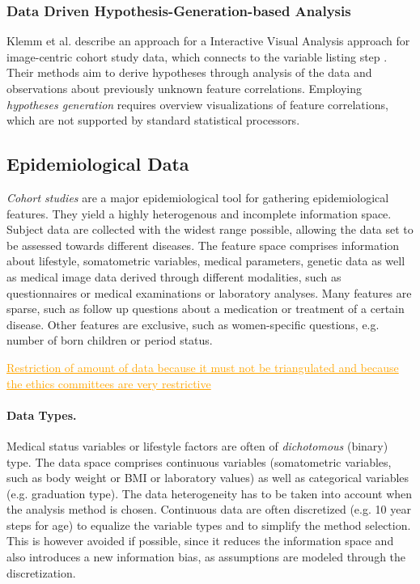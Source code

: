 \documentclass[journal]{style/vgtc} 			          %
\newcommand{\com}[1]{\textcolor{orange}{\uline{#1}}}
\begin{document}
\subsubsection{Data Driven Hypothesis-Generation-based Analysis}
Klemm et al. describe an approach for a Interactive Visual Analysis approach for image-centric cohort study data, which connects to the variable listing step \cite{Klemm2014VIS}.
Their methods aim to derive hypotheses through analysis of the data and observations about previously unknown feature correlations.
Employing \emph{hypotheses generation} requires overview visualizations of feature correlations, which are not supported by standard statistical processors.

\subsection{Epidemiological Data} \label{sec:EpidemiologicalData}
\emph{Cohort studies} are a major epidemiological tool for gathering epidemiological features.
They yield a highly heterogenous and incomplete information space.
Subject data are collected with the widest range possible, allowing the data set to be assessed towards different diseases.
The feature space comprises information about lifestyle, somatometric variables, medical parameters, genetic data as well as medical image data derived through different modalities, such as questionnaires or medical examinations or laboratory analyses.
Many features are sparse, such as follow up questions about a medication or treatment of a certain disease.
Other features are exclusive, such as women-specific questions, e.g. number of born children or period status.

\com{Restriction of amount of data because it must not be triangulated and because the ethics committees are very restrictive}

\paragraph{Data Types.}
Medical status variables or lifestyle factors are often of \emph{dichotomous} (binary) type.
The data space comprises continuous variables (somatometric variables, such as body weight or BMI or laboratory values) as well as categorical variables (e.g. graduation type).
The data heterogeneity has to be taken into account when the analysis method is chosen.
Continuous data are often discretized (e.g. 10 year steps for age) to equalize the variable types and to simplify the method selection.
This is however avoided if possible, since it reduces the information space and also introduces a new information bias, as assumptions are modeled through the discretization.
\end{document}
